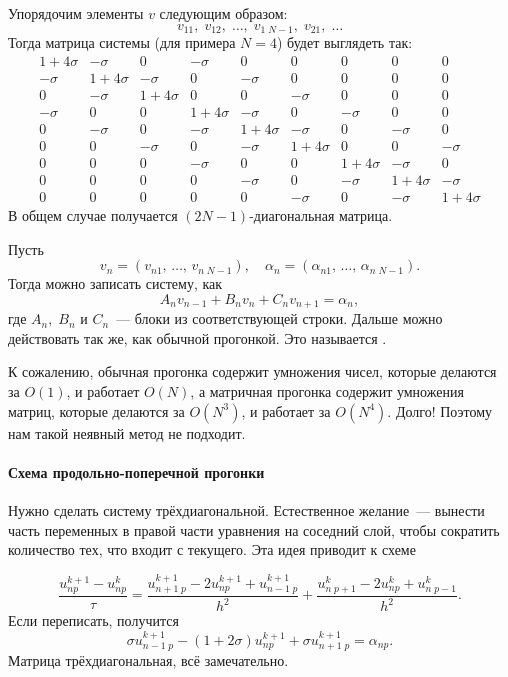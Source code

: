 \documentclass{trlnotes}
\begin{document}
	Упорядочим элементы $v$ следующим образом:
	\[
		v_{11}, \; v_{12}, \; \ldots, \; v_{1 \; N-1}, \; v_{21}, \; \ldots
	\]
	Тогда матрица системы (для примера $N=4$) будет выглядеть так:
	\[
		\begin{array}{ccc|ccc|ccc}
			1 + 4\sigma & -\sigma & 0 & -\sigma & 0 & 0 & 0 & 0 & 0 \\
			-\sigma & 1 + 4\sigma & -\sigma & 0 & -\sigma & 0 & 0 & 0 & 0 \\
			0 & -\sigma & 1 + 4\sigma & 0 & 0 & -\sigma & 0 & 0 & 0 \\
			\hline
			-\sigma & 0 & 0 & 1 + 4\sigma & -\sigma & 0 & -\sigma & 0 & 0 \\
			0 & -\sigma & 0 & -\sigma & 1 + 4\sigma & -\sigma & 0 & -\sigma & 0 \\
			0 & 0 & -\sigma & 0 & -\sigma & 1 + 4\sigma & 0 & 0 & -\sigma \\
			\hline
			0 & 0 & 0 & -\sigma & 0 & 0 & 1 + 4\sigma & -\sigma & 0 \\
			0 & 0 & 0 & 0 & -\sigma & 0 &  -\sigma & 1 + 4\sigma & -\sigma \\
			0 & 0 & 0 & 0 & 0 & -\sigma & 0 & -\sigma & 1 + 4\sigma
		\end{array}
	\]
	В общем случае получается $(2N-1)$-диагональная матрица.

	Пусть
	\[
		v_n = (v_{n1}, \, \ldots, \, v_{n \; N-1}), \quad \alpha_n = (\alpha_{n1}, \, \ldots, \, \alpha_{n \; N-1}).
	\]
	Тогда можно записать систему, как
	\[
		A_n v_{n-1} + B_n v_n + C_n v_{n+1} = \alpha_{n},
	\]
	где $A_n, \; B_n$ и $C_n$~--- блоки из соответствующей строки.
	Дальше можно действовать так же, как обычной прогонкой. Это называется .

	К сожалению, обычная прогонка содержит умножения чисел, которые делаются за $O(1)$, и работает $O(N)$, а матричная прогонка содержит умножения матриц, которые делаются за $O(N^3)$, и работает за $O(N^4)$. Долго! Поэтому нам такой неявный метод не подходит.

	\paragraph{Схема продольно-поперечной прогонки}

	Нужно сделать систему трёхдиагональной. Естественное желание~--- вынести часть переменных в правой части уравнения на соседний слой, чтобы сократить количество тех, что входит с текущего. Эта идея приводит к схеме

	\[
		\dfrac{u^{k+1}_{np} - u^{k}_{np}}{\tau} = \dfrac{u^{k+1}_{n+1 \; p} - 2u^{k+1}_{np} + u^{k+1}_{n-1 \; p}}{h^2} + \dfrac{u^k_{n \; p+1} - 2u^k_{np} + u^k_{n \; p - 1}}{h^2}.
	\]
	Если переписать, получится
	\[
		\sigma u^{k+1}_{n-1 \; p} - (1 + 2\sigma) u_{np}^{k+1} + \sigma u^{k+1}_{n+1 \; p} = \alpha_{np}.
	\]
	Матрица трёхдиагональная, всё замечательно.
\end{document}
